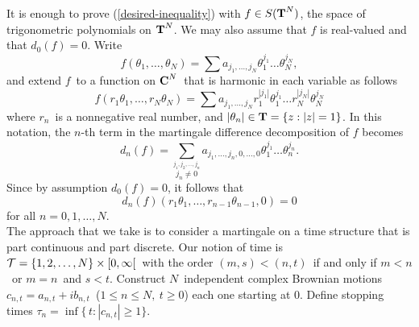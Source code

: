 It is enough to prove (\ref{desired-inequality}) with $f\in S(\T^N)$, 
the space of trigonometric polynomials
 on $\T^N$.  We may also assume that
 $f$ is real-valued and that $d_0(f)=0$.  Write
$$ f(\theta_1,\dots,\theta_N) = \sum a_{j_1,\dots,j_N} \theta_1^{j_1}
   \dots \theta_N^{j_N},$$
and extend 
$f$\ to a function on 
$\C^N$\ that
is harmonic in each variable as follows 
$$ f(r_1 \theta_1, \dots, r_N \theta_N) = \sum a_{j_1,\dots,j_N} 
   r_1^{|j_1|} \theta_1^{j_1}
   \dots r_N^{|j_N|} \theta_N^{j_N} $$
where $r_n$\ is a nonnegative real number, 
and $|\theta_n| \in \T = \{z:
|z| = 1\}$.  In this notation, 
the $n$-th term in the martingale difference decomposition 
of $f$ becomes
$$d_n(f)=\sum_{\stackrel{j_1,j_2,\ldots,j_n}{j_n\neq 0}} 
a_{j_1,\ldots ,j_n,0,\ldots,0} \theta_1^{j_1} \ldots \theta_n^{j_n} .$$
Since by assumption $d_0(f)=0$, it follows that
\begin{equation}
d_n (f) (r_1 \theta_1, \ldots , r_{n-1} \theta_{n-1}, 0)=0
\label{value-at-0}
\end{equation}
for all $n=0,1, \ldots, N.$\\
 
The approach that we take is to consider a martingale 
on a time structure
that is part continuous and part discrete.  
Our notion
of time is ${\cal T} = \{1,2,\dots,N\} \times 
[0,\infty[$\ with the order $(m,s) < (n,t)$\
if and only if $m<n$\ or $m =n$\ and $s < t$.  Construct $N$\ independent
complex Brownian motions $c_{n,t} = a_{n,t} + i b_{n,t}$\ 
($1 \le n \le N,\ t\geq 0$)
each one starting at $0$.  
Define stopping times $\tau_n = \inf\{\, t:
|c_{n,t}| \ge 1\}$.  


